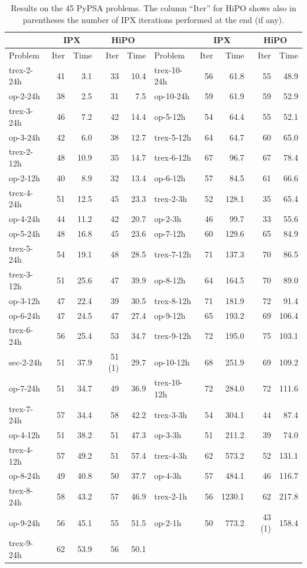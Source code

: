 \documentclass[a4paper]{article}
\newcommand{\0}{\mathbf 0}
\begin{document}
\begin{table}
\tiny
\caption{Results on the 45 PyPSA problems. The column ``Iter'' for HiPO shows also in parentheses the number of IPX iterations performed at the end (if any).}
\label{tab:pypsa_results}
\centering
\begin{tabular}{l|rr|rr||l|rr|rr}
\toprule
& \multicolumn{2}{c|}{IPX} & \multicolumn{2}{c||}{HiPO} & & \multicolumn{2}{c|}{IPX} & \multicolumn{2}{c}{HiPO} \\
\midrule
Problem & Iter & Time & Iter & Time & Problem & Iter & Time & Iter & Time\\
\midrule
trex-2-24h & 41 & 3.1 & 33 & 10.4 & trex-10-24h & 56 & 61.8 & 55 & 48.9 \\
op-2-24h & 38 & 2.5 & 31 & 7.5 & op-10-24h & 59 & 61.9 & 59 & 52.9 \\
trex-3-24h & 46 & 7.2 & 42 & 14.4 & op-5-12h & 54 & 64.4 & 55 & 52.1 \\
op-3-24h & 42 & 6.0 & 38 & 12.7 & trex-5-12h & 64 & 64.7 & 60 & 65.0 \\
trex-2-12h & 48 & 10.9 & 35 & 14.7 & trex-6-12h & 67 & 96.7 & 67 & 78.4 \\
op-2-12h & 40 & 8.9 & 32 & 13.4 & op-6-12h & 57 & 84.5 & 61 & 66.6 \\
trex-4-24h & 51 & 12.5 & 45 & 23.3 & trex-2-3h & 52 & 128.1 & 35 & 65.4 \\
op-4-24h & 44 & 11.2 & 42 & 20.7 & op-2-3h & 46 & 99.7 & 33 & 55.6 \\
op-5-24h & 48 & 16.8 & 45 & 23.6 & op-7-12h & 60 & 129.6 & 65 & 84.9 \\
trex-5-24h & 54 & 19.1 & 48 & 28.5 & trex-7-12h & 71 & 137.3 & 70 & 86.5 \\
trex-3-12h & 51 & 25.6 & 47 & 39.9 & op-8-12h & 64 & 164.5 & 70 & 89.0 \\
op-3-12h & 47 & 22.4 & 39 & 30.5 & trex-8-12h & 71 & 181.9 & 72 & 91.4 \\
op-6-24h & 47 & 24.5 & 47 & 27.4 & op-9-12h & 65 & 193.2 & 69 & 106.4 \\
trex-6-24h & 56 & 25.4 & 53 & 34.7 & trex-9-12h & 72 & 195.0 & 75 & 103.1 \\
sec-2-24h & 51 & 37.9 & 51 (1) & 29.7 & op-10-12h & 68 & 251.9 & 69 & 109.2 \\
op-7-24h & 51 & 34.7 & 49 & 36.9 & trex-10-12h & 72 & 284.0 & 72 & 111.6 \\
trex-7-24h & 57 & 34.4 & 58 & 42.2 & trex-3-3h & 54 & 304.1 & 44 & 87.4 \\
op-4-12h & 51 & 38.2 & 51 & 47.3 & op-3-3h & 51 & 211.2 & 39 & 74.0 \\
trex-4-12h & 57 & 49.2 & 51 & 57.4 & trex-4-3h & 62 & 573.2 & 52 & 131.1 \\
op-8-24h & 49 & 40.8 & 50 & 37.7 & op-4-3h & 57 & 484.1 & 46 & 116.7 \\
trex-8-24h & 58 & 43.2 & 57 & 46.9 & trex-2-1h & 56 & 1230.1 & 62 & 217.8 \\
op-9-24h & 56 & 45.1 & 55 & 51.5 & op-2-1h & 50 & 773.2 & 43 (1) & 158.4 \\
trex-9-24h & 62 & 53.9 & 56 & 50.1 & & & & & \\
\bottomrule
\end{tabular}
\end{table}
\end{document}
